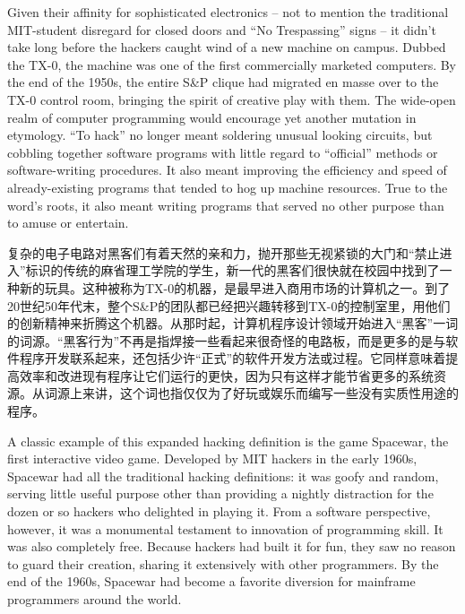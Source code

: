 \ifdefined\eng
Given their affinity for sophisticated electronics -- not to mention the traditional MIT-student disregard for closed doors and ``No Trespassing'' signs -- it didn't take long before the hackers caught wind of a new machine on campus. Dubbed the TX-0, the machine was one of the first commercially marketed computers. By the end of the 1950s, the entire S\&P clique had migrated en masse over to the TX-0 control room, bringing the spirit of creative play with them. The wide-open realm of computer programming would encourage yet another mutation in etymology. ``To hack'' no longer meant soldering unusual looking circuits, but cobbling together software programs with little regard to ``official'' methods or software-writing procedures. It also meant improving the efficiency and speed of already-existing programs that tended to hog up machine resources. True to the word's roots, it also meant writing programs that served no other purpose than to amuse or entertain.
\fi

\ifdefined\chs
复杂的电子电路对黑客们有着天然的亲和力，抛开那些无视紧锁的大门和``禁止进入''标识的传统的麻省理工学院的学生，新一代的黑客们很快就在校园中找到了一种新的玩具。这种被称为TX-0的机器，是最早进入商用市场的计算机之一。到了20世纪50年代末，整个S\&P的团队都已经把兴趣转移到TX-0的控制室里，用他们的创新精神来折腾这个机器。从那时起，计算机程序设计领域开始进入``黑客''一词的词源。``黑客行为''不再是指焊接一些看起来很奇怪的电路板，而是更多的是与软件程序开发联系起来，还包括少许``正式''的软件开发方法或过程。它同样意味着提高效率和改进现有程序让它们运行的更快，因为只有这样才能节省更多的系统资源。从词源上来讲，这个词也指仅仅为了好玩或娱乐而编写一些没有实质性用途的程序。
\fi

\ifdefined\eng
A classic example of this expanded hacking definition is the game Spacewar, the first interactive video game. Developed by MIT hackers in the early 1960s, Spacewar had all the traditional hacking definitions: it was goofy and random, serving little useful purpose other than providing a nightly distraction for the dozen or so hackers who delighted in playing it. From a software perspective, however, it was a monumental testament to innovation of programming skill. It was also completely free. Because hackers had built it for fun, they saw no reason to guard their creation, sharing it extensively with other programmers. By the end of the 1960s, Spacewar had become a favorite diversion for mainframe programmers around the world. %
\fi


